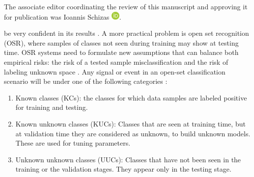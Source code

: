 \documentclass{ieeeaccess}
\begin{document}
\begin{footnotesize}
The associate editor coordinating the review of this manuscript and approving it for publication was Ioannis Schizas \href{https://orcid.org/0000-0002-1714-5578}{\includegraphics{img/orcid.png}}.

\end{footnotesize}

\noindent be very confident in its results  \cite{1}. A more practical problem is open set recognition (OSR), where samples of classes not seen during training may show at testing time. OSR systems need to formulate new assumptions that can balance both empirical risks: the risk of a tested sample misclassification and the risk of labeling unknown space \cite{2}. Any signal or event in an open-set classification scenario will be under one of the following categories  \cite{3}:
\begin{enumerate}
	\item Known classes (KCs): the classes for which data samples are labeled positive for training and testing.
	\item Known unknown classes (KUCs): Classes that are seen at training time, but at validation time they are considered as unknown, to build unknown models. These are used for tuning parameters.  
	\item Unknown unknown classes (UUCs): Classes that have not been seen in the training or the validation stages. They appear only in the testing stage.
\end{enumerate} 
\end{document}
